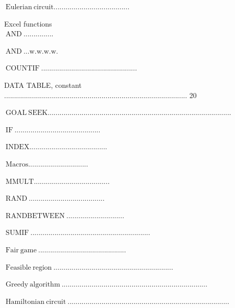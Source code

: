 \documentclass[10pt]{article}
\begin{document}
$\mathrm{~ E u l e r i a n ~ c i r c u i t . . . . . . . . . . . . . . . . . . . . . . . . . . . . . . . . . . . . . .}$

Excel functions\\
$\mathrm{~ A N D ~ . . . . . . . . . . . . . . .}$

$\mathrm{~ A N D ~ . . . w . w . w . w .}$

$\mathrm{~ C O U N T I F ~ . . . . . . . . . . . . . . . . . . . . . . . . . . . . . . . . . . . . . . . . . . . . . . . .}$

DATA TABLE, constant ............................................................................................ 20

$\mathrm{~ G O A L ~ S E E K . . . . . . . . . . . . . . . . . . . . . . . . . . . . . . . . . . . . . . . . . . . . . . . . . . . . . . . . . . . . . . . . . . . . . . . . . . . . . . . . . . . . . . . . . . . .}$

$\mathrm{~ I F ~ . . . . . . . . . . . . . . . . . . . . . . . . . . . . . . . . . . . . . . . . . . .}$

$\mathrm{~ I N D E X . . . . . . . . . . . . . . . . . . . . . . . . . . . . . . . . . . . . . . .}$

$\mathrm{~ M a c r o s . . . . . . . . . . . . . . . . . . . . . . . . . . . . . .}$

$\mathrm{~ M M U L T . . . . . . . . . . . . . . . . . . . . . . . . . . . . . . . . . . . . . .}$

$\mathrm{~ R A N D ~ . . . . . . . . . . . . . . . . . . . . . . . . . . . . . . . . . . . . . .}$

$\mathrm{~ R A N D B E T W E E N ~ . . . . . . . . . . . . . . . . . . . . . . . . . . . . .}$

$\mathrm{~ S U M I F ~ . . . . . . . . . . . . . . . . . . . . . . . . . . . . . . . . . . . . . . . . . . . . . . . . . . . . . . . . . . . .}$

$\mathrm{~ F a i r ~ g a m e ~ . . . . . . . . . . . . . . . . . . . . . . . . . . . . . . . . . . . . . . . . . . . .}$

$\mathrm{~ F e a s i b l e ~ r e g i o n ~ . . . . . . . . . . . . . . . . . . . . . . . . . . . . . . . . . . . . . . . . . . . . . . . . . . . . . . . . . . . .}$

$\mathrm{~ G r e e d y ~ a l g o r i t h m ~ . . . . . . . . . . . . . . . . . . . . . . . . . . . . . . . . . . . . . . . . . . . . . . . . . . . . . . . . . . . . . . . . . . . . . . . . .}$

$\mathrm{~ H a m i l t o n i a n ~ c i r c u i t ~ . . . . . . . . . . . . . . . . . . . . . . . . . . . . . . . . . . . . . . . . . . . . . . . . . . . . . . . . . . . . . . . . . . . . . . . . . . . . . . . . .}$
\end{document}
